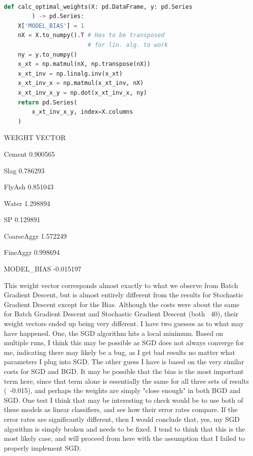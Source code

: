 \documentclass[12pt, fullpage,letterpaper]{article}
\begin{document}
\begin{enumerate}
\begin{enumerate}
		\begin{lstlisting}[language=Python, caption=Optimal Weights Function]

def calc_optimal_weights(X: pd.DataFrame, y: pd.Series
        ) -> pd.Series:
    X['MODEL_BIAS'] = 1
    nX = X.to_numpy().T # Has to be transposed 
                        # for lin. alg. to work
    ny = y.to_numpy()
    x_xt = np.matmul(nX, np.transpose(nX))
    x_xt_inv = np.linalg.inv(x_xt)
    x_xt_inv_x = np.matmul(x_xt_inv, nX)
    x_xt_inv_x_y = np.dot(x_xt_inv_x, ny)
    return pd.Series(
        x_xt_inv_x_y, index=X.columns
    )

	    \end{lstlisting}
		
		WEIGHT VECTOR
		
	    Cement        0.900565
	    
        Slag          0.786293
        
        FlyAsh        0.851043
        
        Water         1.298894
        
        SP            0.129891
        
        CoarseAggr    1.572249
        
        FineAggr      0.998694
        
        MODEL\_BIAS   -0.015197
    
        This weight vector corresponds almost exactly to what we observe from Batch Gradient Descent, but is almost entirely different from the results for Stochastic Gradient Descent except for the Bias. Although the costs were about the same for Batch Gradient Descent and Stochastic Gradient Descent (both ~40), their weight vectors ended up being very different. I have two guesses as to what may have happened. One, the SGD algorithm hits a local minimum. Based on multiple runs, I think this may be possible as SGD does not always converge for me, indicating there may likely be a bug, as I get bad results no matter what parameters I plug into SGD. The other guess I have is based on the very similar costs for SGD and BGD. It may be possible that the bias is the most important term here, since that term alone is essentially the same for all three sets of results (~-0.015), and perhaps the weights are simply "close enough" in both BGD and SGD. One test I think that may be interesting to check would be to use both of these models as linear classifiers, and see how their error rates compare. If the error rates are significantly different, then I would conclude that, yes, my SGD algorithm is simply broken and needs to be fixed. I tend to think that this is the most likely case, and will proceed from here with the assumption that I failed to properly implement SGD.
    
	\end{enumerate}

\end{enumerate}
\end{document}
